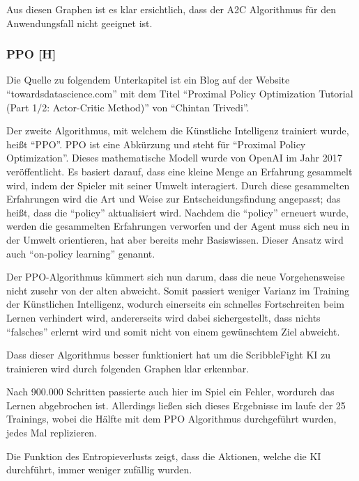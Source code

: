 Aus diesen Graphen ist es klar ersichtlich, dass der A2C Algorithmus für den Anwendungsfall nicht geeignet ist.


\subsubsection{PPO [H]}\label{maai:ppo:head}
Die Quelle zu folgendem Unterkapitel ist ein Blog auf der Website ``towardsdatascience.com'' mit dem Titel ``Proximal Policy Optimization Tutorial (Part 1/2: Actor-Critic Method)'' von ``Chintan Trivedi''. \cite{ppo:cite}

Der zweite Algorithmus, mit welchem die Künstliche Intelligenz trainiert wurde, heißt ``PPO''.
PPO ist eine Abkürzung und steht für ``Proximal Policy Optimization''. Dieses mathematische Modell
wurde von OpenAI im Jahr 2017 veröffentlicht. Es basiert darauf, dass eine kleine Menge an Erfahrung gesammelt wird, indem der Spieler mit seiner Umwelt interagiert.
Durch diese gesammelten Erfahrungen wird die Art und Weise zur Entscheidungsfindung angepasst; das heißt, dass die ``policy'' aktualisiert wird.
Nachdem die ``policy'' erneuert wurde, werden die gesammelten Erfahrungen verworfen und der Agent muss sich neu in der Umwelt orientieren, hat aber bereits mehr Basiswissen.
Dieser Ansatz wird auch ``on-policy learning'' genannt.

Der PPO-Algorithmus kümmert sich nun darum, dass die neue Vorgehensweise nicht zusehr von der alten abweicht.
Somit passiert weniger Varianz im Training der Künstlichen Intelligenz, wodurch einerseits ein schnelles Fortschreiten
beim Lernen verhindert wird, andererseits wird dabei sichergestellt, dass nichts ``falsches''
erlernt wird und somit nicht von einem gewünschtem Ziel abweicht.


Dass dieser Algorithmus besser funktioniert hat um die ScribbleFight KI zu trainieren wird durch folgenden
Graphen klar erkennbar.

Nach 900.000 Schritten passierte auch hier im Spiel ein Fehler, wordurch das Lernen abgebrochen ist.
Allerdings ließen sich dieses Ergebnisse im laufe der 25 Trainings, wobei die Hälfte mit dem PPO Algorithmus durchgeführt wurden,
jedes Mal replizieren.

Die Funktion des Entropieverlusts zeigt, dass die Aktionen, welche die KI durchführt, immer weniger zufällig
wurden.

